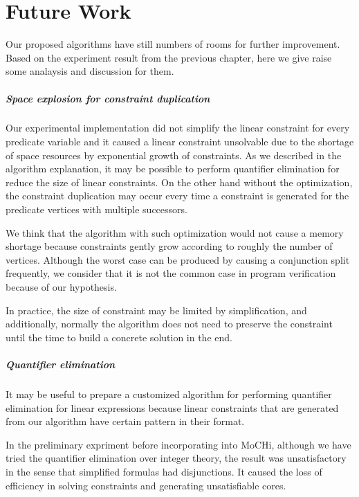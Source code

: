 ﻿\chapter{Future Work}
\label{chap:future}

Our proposed algorithms have still numbers of rooms for further
improvement.  Based on the experiment result from the previous
chapter, here we give raise some analaysis and discussion for them.

\paragraph{Space explosion for constraint duplication}
Our experimental implementation did not simplify the linear constraint
for every predicate variable and it caused a linear constraint
unsolvable due to the shortage of space resources by exponential
growth of constraints.  As we described in the algorithm explanation,
it may be possible to perform quantifier elimination for reduce the
size of linear constraints.  On the other hand without the
optimization, the constraint duplication may occur every time a
constraint is generated for the predicate vertices with multiple
successors.

We think that the algorithm with such optimization would not cause a
memory shortage because constraints gently grow according to roughly
the number of vertices.  Although the worst case can be produced by
causing a conjunction split frequently, we consider that it is not the
common case in program verification because of our hypothesis.

In practice, the size of constraint may be limited by simplification,
and additionally, normally the algorithm does not need to preserve the
constraint until the time to build a concrete solution in the end.


\paragraph{Quantifier elimination}
It may be useful to prepare a customized algorithm for performing
quantifier elimination for linear expressions because linear
constraints that are generated from our algorithm have certain pattern
in their format.

In the preliminary expriment before incorporating into MoCHi, although
we have tried the quantifier elimination over integer theory, the
result was unsatisfactory in the sense that simplified formulas had
disjunctions.  It caused the loss of efficiency in solving constraints
and generating unsatisfiable cores.

